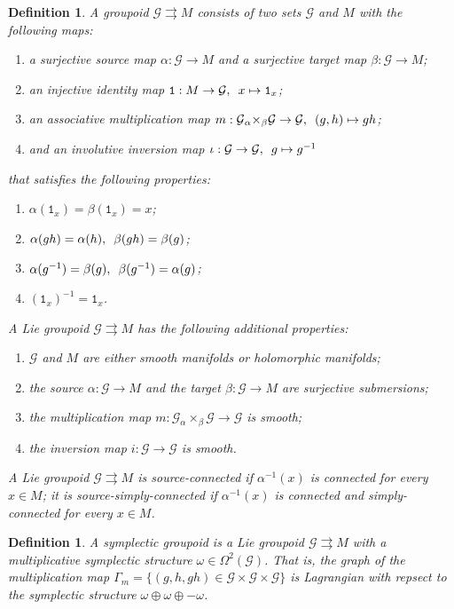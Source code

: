 \documentclass{amsart}
\newtheorem{definition}[theorem]{Definition}
\newcommand{\cG}{\mathcal{G}}
\newcommand{\rra}{\rightrightarrows}
\begin{document}
\begin{definition}
A groupoid $\cG \rightrightarrows M$ consists of two sets $\cG$ and $M$ with the following maps:
	\begin{enumerate}
		\item a surjective source map $\alpha: \cG \to M$ and a surjective target map $\beta: \cG \to M$;
		\item an injective identity map $\mathtt{1}: M \to \cG, \enskip x \mapsto \mathtt{1}_x$;
		\item an associative multiplication map $m: \cG {_\alpha \times_\beta} \cG \to \cG, \enskip (g, h) \mapsto gh$;
		\item and an involutive inversion map $\iota: \cG \to \cG, \enskip g \mapsto g^{-1}$
	\end{enumerate}
that satisfies the following properties:
	\begin{enumerate}
		\item $\alpha(\mathtt{1}_x) = \beta(\mathtt{1}_x) = x$;
		\item $\alpha(gh) = \alpha(h), \enskip \beta(gh) = \beta(g)$;
		\item $\alpha(g^{-1}) = \beta(g), \enskip \beta(g^{-1}) = \alpha(g)$;
		\item $(\mathtt{1}_x)^{-1} = \mathtt{1}_x$.
	\end{enumerate}
A Lie groupoid $\cG \rightrightarrows M$ has the following additional properties:
	\begin{enumerate}
		\item $\cG$ and $M$ are either smooth manifolds or holomorphic manifolds;
		\item the source $\alpha: \cG \to M$ and the target $\beta: \cG \to M$ are surjective submersions;
		\item the multiplication map $m: \cG {_\alpha \times_\beta} \cG \to \cG$ is smooth;
		\item the inversion map $i: \cG \to \cG$ is smooth.
	\end{enumerate}
A Lie groupoid $\cG \rightrightarrows M$ is source-connected if $\alpha^{-1}(x)$ is connected for every $x \in M$; it is source-simply-connected if $\alpha^{-1}(x)$ is connected and simply-connected for every $x \in M$.
\end{definition}

\begin{definition}
A symplectic groupoid is a Lie groupoid $\cG \rra M$ with a multiplicative symplectic structure $\omega \in \Omega^2(\cG)$. That is, the graph of the multiplication map $\Gamma_m = \{(g, h, gh) \in \cG \times \cG \times \cG\}$ is Lagrangian with repsect to the symplectic structure $\omega \oplus \omega \oplus -\omega$.
\end{definition}
\end{document}
